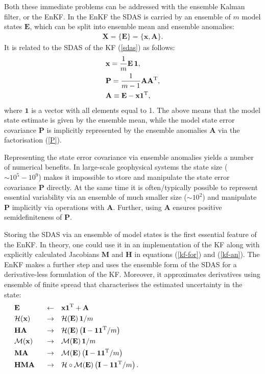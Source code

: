 \documentclass[11pt]{report}
\newcommand{\mb} {\mathbf}
\newcommand{\T}{^{\tiny \mathrm T}}
\begin{document}
Both these immediate problems can be addressed with the ensemble Kalman filter, or the EnKF.
In the EnKF the SDAS is carried by an ensemble of $m$ model states $\mb E$, which can be split into ensemble mean and ensemble anomalies:
\begin{align}
  \label{sdas-enkf}
  \mb X = \{\mb E\} = \{\mb x, \mb A\}.
\end{align}
It is related to the SDAS of the KF (\ref{sdas}) as follows:
\begin{subequations}
  \label{E}
  \begin{align}
    \label{x}
    &\mb x = \frac{1}{m} \mb E \,\mb 1,\\
    \label{P}
    &\mb P = \frac{1}{m - 1} \mb A \mb A\T,\\
    \label{A}
    &\mb A \equiv \mb E - \mb x \mb 1\T,
  \end{align}
\end{subequations}
where $\mb 1$ is a vector with all elements equal to 1.
The above means that the model state estimate is given by the ensemble mean, while the model state error covariance $\mb P$ is implicitly represented by the ensemble anomalies $\mb A$ via the factorisation (\ref{P}).

Representing the state error covariance via ensemble anomalies yields a number of numerical benefits.
In large-scale geophysical systems the state size ($\sim 10^5-10^9$) makes it impossible to store and manipulate the state error covariance $\mb P$ directly.
At the same time it is often/typically possible to represent essential variability via an ensemble of much smaller size ($\sim 10^2$) and manipulate $\mb P$ implicitly via operations with $\mb A$.
Further, using $\mb A$ ensures positive semidefiniteness of $\mb P$.

Storing the SDAS via an ensemble of model states is the first essential feature of the EnKF.
In theory, one could use it in an implementation of the KF along with explicitly calculated Jacobians $\mb M$ and $\mb H$ in equations (\ref{kf-for}) and (\ref{kf-an}).
The EnKF makes a further step and uses the ensemble form of the SDAS for a derivative-less formulation of the KF.
Moreover, it approximates derivatives using ensemble of finite spread that characterises the estimated uncertainty in the state:
\begin{subequations}
  \label{der-less-enkf}
  \begin{align}
    &\mb E \quad &\leftarrow& \quad \mb x \mb 1 \T  + \mb A \hspace{8cm}\\
    &\mathcal H (\mb x) \quad &\to& \quad \mathcal H (\mb E) \, \mb 1 / m\\
    &\mb H \mb A \quad &\to& \quad \mathcal H(\mb E)\left(\mb I - \mb 1 \mb 1\T / m\right)\\
    &\mathcal M (\mb x) \quad &\to& \quad \mathcal M (\mb E) \, \mb 1 / m\\
    &\mb M \mb A \quad &\to& \quad \mathcal M(\mb E)\left(\mb I - \mb 1 \mb 1\T / m\right)\\
    &\mb H \mb M \mb A &\to& \quad \mathcal H \circ \mathcal M(\mb E) \left(\mb I - \mb 1 \mb 1\T /m \right).
  \end{align}
\end{subequations}
\end{document}
